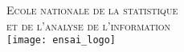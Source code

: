 \textsc{{\LARGE Ecole nationale de la statistique \\et de l'analyse de l'information}} \\ %
\vspace{5mm}
\texttt{[image: ensai\_logo]}\\[1.0 cm] %

